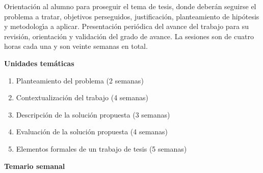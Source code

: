 Orientaci\'{o}n al alumno para proseguir el tema de tesis, donde deber\'{a}n
seguirse el problema a tratar, objetivos perseguidos, justificaci\'{o}n,
planteamiento de hip\'{o}tesis y metodolog\'{\i}a a aplicar.  Presentaci\'{o}n
peri\'{o}dica del avance del trabajo para su revisi\'{o}n, orientaci\'{o}n y
validaci\'{o}n del grado de avance. La sesiones son de cuatro horas cada
una y son veinte semanas en total.

{\bf Unidades tem\'{a}ticas}

\begin{enumerate}[itemsep=-2pt]
\item Planteamiento del problema (2 semanas)
\item Contextualizaci\'{o}n del trabajo (4 semanas)
\item Descripci\'{o}n de la soluci\'{o}n propuesta (3 semanas)
\item Evaluaci\'{o}n de la soluci\'{o}n propuesta (4 semanas)
\item Elementos formales de un trabajo de tesis (5 semanas)
\end{enumerate}

{\bf Temario semanal}